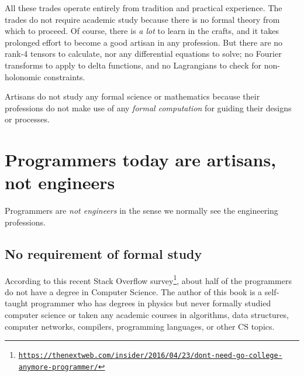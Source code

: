 All these trades operate entirely from tradition and practical experience.
The trades do not require academic study because there is no formal
theory from which to proceed. Of course, there is \emph{a lot} to
learn in the crafts, and it takes prolonged effort to become a good
artisan in any profession. But there are no rank-4 tensors to calculate,
nor any differential equations to solve; no Fourier transforms to
apply to delta functions, and no Lagrangians to check for non-holonomic
constraints.

Artisans do not study any formal science or mathematics because their
professions do not make use of any \emph{formal computation} for guiding
their designs or processes.

\section{Programmers today are artisans, not engineers }

Programmers are \emph{not engineers} in the sense we normally see
the engineering professions.

\subsection{No requirement of formal study }

According to this recent Stack Overflow survey\footnote{\texttt{\href{https://thenextweb.com/insider/2016/04/23/dont-need-go-college-anymore-programmer/}{https://thenextweb.com/insider/2016/04/23/dont-need-go-college-anymore-programmer/}}},
about half of the programmers do not have a degree in Computer Science.
The author of this book is a self-taught programmer who has degrees
in physics but never formally studied computer science or taken any
academic courses in algorithms, data structures, computer networks,
compilers, programming languages, or other CS topics. 

